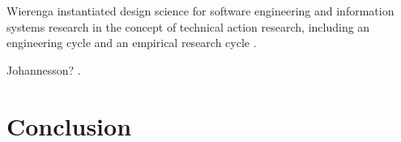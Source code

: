 \documentclass[graybox]{svmult}
\begin{document}
Wierenga instantiated design science for software engineering and information systems research in the concept of technical action research, including an engineering cycle and an empirical research cycle \cite{wieringa_design_2009,wieringa_six_2015,wieringa_technical_2012,wieringa_what_2014}.

Johannesson? \cite{johannesson_introduction_2014}.

\section{Conclusion}





\end{document}
